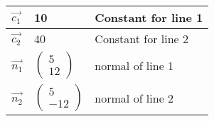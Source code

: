 \begin{tabular}{|l|l|l|}
\hline
    $\Vec{c_1}$ & 10 & Constant for line 1 \\
    \hline
    $\Vec{c_2}$ & 40 & Constant for line 2\\
    \hline
    $\Vec{n_1}$ & $\begin{pmatrix}5\\12\end{pmatrix}$ & normal of line 1 \\
    \hline
    $\Vec{n_2}$ & $\begin{pmatrix}5\\ -12\end{pmatrix}$ & normal of line 2\\
    \hline
\end{tabular}